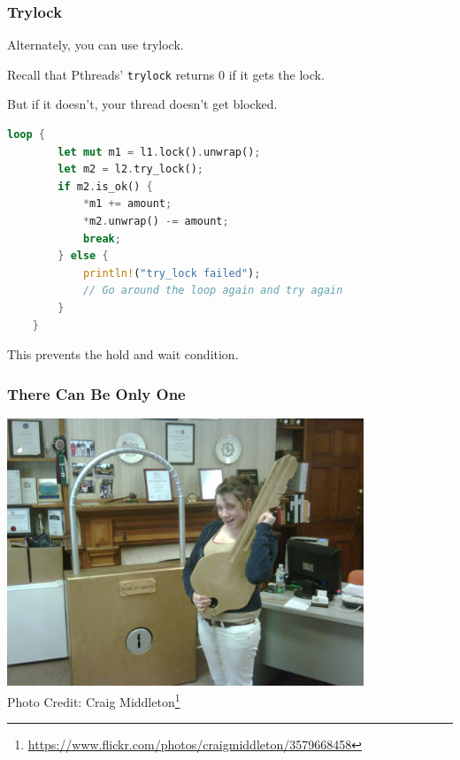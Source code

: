 \begin{frame}[fragile]
\frametitle{Trylock}

Alternately, you can use trylock. 

Recall that Pthreads' {\tt trylock} returns 0 if it gets the lock. 

But if it doesn't, your thread doesn't get blocked. 

  \begin{lstlisting}[language=Rust]
    loop {
        let mut m1 = l1.lock().unwrap();
        let m2 = l2.try_lock();
        if m2.is_ok() {
            *m1 += amount;
            *m2.unwrap() -= amount;
            break;
        } else {
            println!("try_lock failed");
            // Go around the loop again and try again
        }
    }
  \end{lstlisting}
  
This prevents the hold and wait condition.

\end{frame}



\begin{frame}
\frametitle{There Can Be Only One}

\begin{center}
	\includegraphics[width=0.8\textwidth]{images/giantlock.jpg}\\
	\hfill Photo Credit: Craig Middleton\footnote{\url{https://www.flickr.com/photos/craigmiddleton/3579668458}}
\end{center}


\end{frame}



